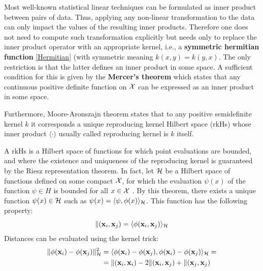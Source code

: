 \documentclass[12pt, letterpaper]{article}
\theoremstyle{definition}
\newcommand{\x}{\mathbf{x}}
\let\tb\textbf
\begin{document}
Most  well-known statistical linear techniques can be formulated as inner product between pairs of data. Thus, applying any non-linear transformation to the data can only impact the values of the resulting inner products. Therefore one does not need to compute such transformation explicitly but needs only to replace the inner product operator with an appropriate kernel, i.e., a \tb{symmetric hermitian function} \autoref{Hermitian} (with symmetric meaning $k(x,y) = k(y,x)$. The only restriction is that the latter defines an inner product in some space. A sufficient condition for this is given by the \tb{Mercer's theorem} which states that any continuous positive definite function on $\CMcal{X}$ can be expressed as an inner product in some space.

Furthermore, Moore-Aronszajn  theorem states that to any positive semidefinite kernel $k$ it corresponds  a unique reproducing kernel Hilbert space (rkHs)  whose inner product $\langle\cdot \rangle$ usually called reproducing kernel is $k$ itself.

A rkHs is a Hilbert space of functions for which point evaluations are bounded, and where the existence and uniqueness of the reproducing kernel is guaranteed by the Riesz representation theorem. In fact, let $\CMcal{H}$ be a Hilbert space of functions defined on some compact $\CMcal{X}$, for which the evaluation $\psi(x)$ of the function $\psi \in H$ is bounded for all $x \in \CMcal{X}$ . By this theorem, there exists a unique function $\psi(x) \in \CMcal{H}$ such as $\psi(x) = \langle\psi,\phi(x)\rangle_\CMcal{H}$. This function has the following property:
\begin{equation}
\label{EqProd}
\CMcal{k}(\x_i, \x_j) = \langle \phi(\x_i, \x_j) \rangle_\CMcal{H}
\end{equation}
Distances can be evaluated using the kernel trick:
\begin{equation}
\begin{aligned}
\| \phi(\x_i) - \phi(\x_j) \|^2_\CMcal{H} &= \langle \phi(\x_i)- \phi(\x_j),  \phi(\x_i)- \phi(\x_j)\rangle_\CMcal{H}  =\\
&=\CMcal{k}(\x_i, \x_i)- 2 \CMcal{k}(\x_i, \x_j)+\CMcal{k}(\x_j, \x_j)
\end{aligned}
\end{equation}
\end{document}

